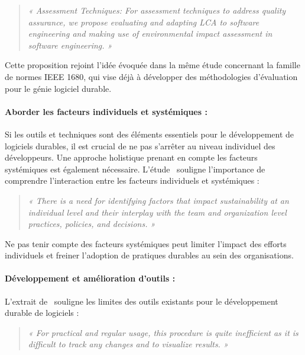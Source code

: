 \begin{quote}
    
    \emph{« Assessment Techniques: For assessment techniques to address quality assurance, we propose evaluating and adapting LCA to software engineering and making use of environmental impact assessment in software engineering. »}
    
\end{quote}


Cette proposition rejoint l'idée évoquée dans la même étude concernant la famille de normes IEEE 1680, qui vise déjà à développer des méthodologies d'évaluation pour le génie logiciel durable.

\paragraph{Aborder les facteurs individuels et systémiques :} Si les outils et techniques sont des éléments essentiels pour le développement de logiciels durables, il est crucial de ne pas s'arrêter au niveau individuel des développeurs. Une approche holistique prenant en compte les facteurs systémiques est également nécessaire. L'étude~\cite{SustainableEngNeglectedPerspective} souligne l'importance de comprendre l'interaction entre les facteurs individuels et systémiques :

\begin{quote}
    
    \emph{« There is a need for identifying factors that impact sustainability at an individual level and their interplay with the team and organization level practices, policies, and decisions. »}
    
\end{quote}


Ne pas tenir compte des facteurs systémiques peut limiter l'impact des efforts individuels et freiner l'adoption de pratiques durables au sein des organisations.

\paragraph{Développement et amélioration d'outils :} L'extrait de~\cite{SustainabilityAwarenessFramework} souligne les limites des outils existants pour le développement durable de logiciels :

\begin{quote}
    
    \emph{« For practical and regular usage, this procedure is quite inefficient as it is difficult to track any changes and to visualize results. »}
    
\end{quote}


